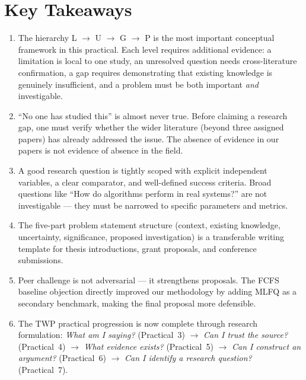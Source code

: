 \documentclass[11pt, a4paper]{article}
\begin{document}
\section{Key Takeaways}

\begin{enumerate}[nosep]
    \item The hierarchy L $\to$ U $\to$ G $\to$ P is the most important conceptual framework in this practical. Each level requires additional evidence: a limitation is local to one study, an unresolved question needs cross-literature confirmation, a gap requires demonstrating that existing knowledge is genuinely insufficient, and a problem must be both important \emph{and} investigable.

    \item ``No one has studied this'' is almost never true. Before claiming a research gap, one must verify whether the wider literature (beyond three assigned papers) has already addressed the issue. The absence of evidence in our papers is not evidence of absence in the field.

    \item A good research question is tightly scoped with explicit independent variables, a clear comparator, and well-defined success criteria. Broad questions like ``How do algorithms perform in real systems?'' are not investigable --- they must be narrowed to specific parameters and metrics.

    \item The five-part problem statement structure (context, existing knowledge, uncertainty, significance, proposed investigation) is a transferable writing template for thesis introductions, grant proposals, and conference submissions.

    \item Peer challenge is not adversarial --- it strengthens proposals. The FCFS baseline objection directly improved our methodology by adding MLFQ as a secondary benchmark, making the final proposal more defensible.

    \item The TWP practical progression is now complete through research formulation: \textit{What am I saying?} (Practical~3) $\rightarrow$ \textit{Can I trust the source?} (Practical~4) $\rightarrow$ \textit{What evidence exists?} (Practical~5) $\rightarrow$ \textit{Can I construct an argument?} (Practical~6) $\rightarrow$ \textit{Can I identify a research question?} (Practical~7).
\end{enumerate}
\end{document}
